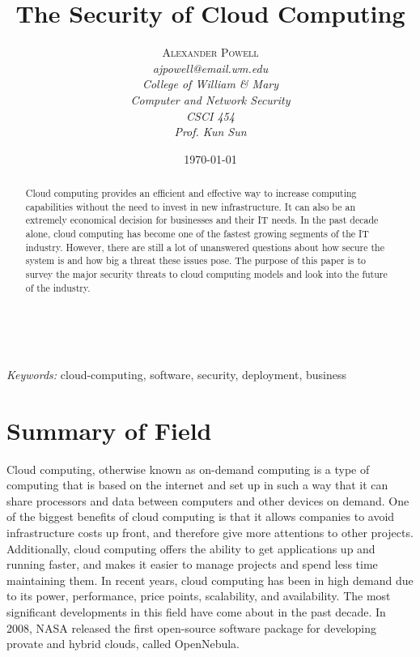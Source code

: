 \documentclass[a4paper, 8pt]{article} %
\title{\textbf{The Security of Cloud Computing}} %
\author{\textsc{Alexander Powell} %
\\{\textit{ajpowell@email.wm.edu}} %
\\{\textit{College of William \& Mary}} %
\\{\textit{Computer and Network Security}} %
\\{\textit{CSCI 454}} %
\\{\textit{Prof. Kun Sun}}} %
\date{\today} %
\makeatletter
\renewcommand{\maketitle}{ %
\begin{flushright} %
{\LARGE\@title} %

\vspace{50pt} %

{\large\@author} %
\\\@date %

\vspace{40pt} %
\end{flushright}
}
\makeatother
\begin{document}
\maketitle %



\begin{abstract}
Cloud computing provides an efficient and effective way to increase computing capabilities without the need to invest in new infrastructure.  It can also be an extremely economical decision for businesses and their IT needs.  In the past decade alone, cloud computing has become one of the fastest growing segments of the IT industry.  However, there are still a lot of unanswered questions about how secure the system is and how big a threat these issues pose.  The purpose of this paper is to survey the major security threats to cloud computing models and look into the future of the industry.  
\end{abstract}

\hspace*{3,6mm}\textit{Keywords:} cloud-computing, software, security, deployment, business %

\vspace{30pt} %


\newpage

\section*{Summary of Field}

Cloud computing, otherwise known as on-demand computing is a type of computing that is based on the internet and set up in such a way that it can share processors and data between computers and other devices on demand.  One of the biggest benefits of cloud computing is that it allows companies to avoid infrastructure costs up front, and therefore give more attentions to other projects.  Additionally, cloud computing offers the ability to get applications up and running faster, and makes it easier to manage projects and spend less time maintaining them.  In recent years, cloud computing has been in high demand due to its power, performance, price points, scalability, and availability.  The most significant developments in this field have come about in the past decade.  In 2008, NASA released the first open-source software package for developing provate and hybrid clouds, called OpenNebula.  
\end{document}

